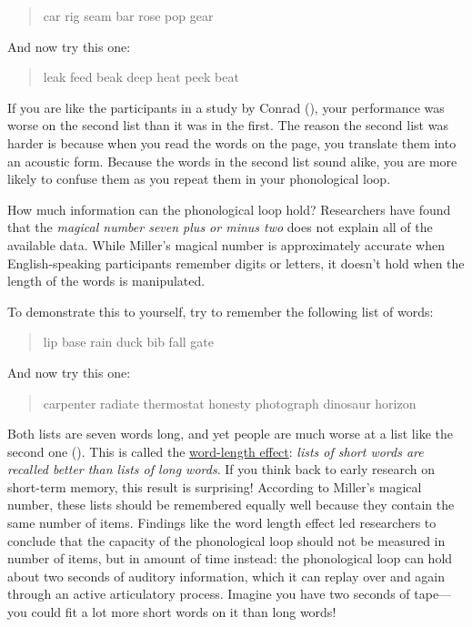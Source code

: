 \documentclass[
]{krantz}
\begin{document}
\begin{quote}
car rig seam bar rose pop gear
\end{quote}

And now try this one:

\begin{quote}
leak feed beak deep heat peek beat
\end{quote}

If you are like the participants in a study by Conrad (), your performance was worse on the second list than it was in the first. The reason the second list was harder is because when you read the words on the page, you translate them into an acoustic form. Because the words in the second list sound alike, you are more likely to confuse them as you repeat them in your phonological loop.

How much information can the phonological loop hold? Researchers have found that the \emph{magical number seven plus or minus two} does not explain all of the available data. While Miller's magical number is approximately accurate when English-speaking participants remember digits or letters, it doesn't hold when the length of the words is manipulated.

To demonstrate this to yourself, try to remember the following list of words:

\begin{quote}
lip base rain duck bib fall gate
\end{quote}

And now try this one:

\begin{quote}
carpenter radiate thermostat honesty photograph dinosaur horizon
\end{quote}

Both lists are seven words long, and yet people are much worse at a list like the second one (). This is called the \hyperref[word-length-effect]{word-length effect}: \emph{lists of short words are recalled better than lists of long words}. If you think back to early research on short-term memory, this result is surprising! According to Miller's magical number, these lists should be remembered equally well because they contain the same number of items. Findings like the word length effect led researchers to conclude that the capacity of the phonological loop should not be measured in number of items, but in amount of time instead: the phonological loop can hold about two seconds of auditory information, which it can replay over and again through an active articulatory process. Imagine you have two seconds of tape--- you could fit a lot more short words on it than long words!
\end{document}
